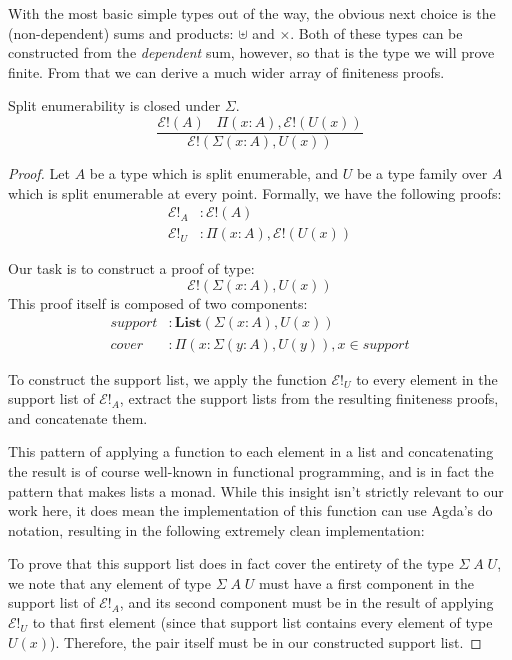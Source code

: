 With the most basic simple types out of the way, the obvious next choice is the
(non-dependent) sums and products: \(\uplus\) and \(\times\).
Both of these types can be constructed from the \emph{dependent} sum, however,
so that is the type we will prove finite.
From that we can derive a much wider array of finiteness proofs.
\begin{lemma} \label{split-enum-sigma}
  Split enumerability is closed under \(\Sigma\).
  \begin{equation}
    \frac{
      \mathcal{E}!(A) \; \; \; \Pi(x : A) , \mathcal{E}!(U(x))
    }{
      \mathcal{E}!(\Sigma(x : A) , U(x))
    }
  \end{equation}
\end{lemma}
\begin{proof}
  Let \(A\) be a type which is split enumerable, and \(U\) be a type family over
  \(A\) which is split enumerable at every point.
  Formally, we have the following proofs:
  \begin{align}
    \mathcal{E}!_A &: \mathcal{E}!(A) \\
    \mathcal{E}!_U &: \Pi(x : A) , \mathcal{E}!(U(x))
  \end{align}

  Our task is to construct a proof of type:
  \begin{equation}
    \mathcal{E}!(\Sigma(x : A) , U(x))
  \end{equation}
  This proof itself is composed of two components:
  \begin{align}
    \mathit{support} &: \mathbf{List}(\Sigma(x : A) , U(x)) \\
    \mathit{cover} &: \Pi(x : \Sigma(y : A) , U(y)) , x \in \mathit{support}
  \end{align}

  To construct the support list, we apply the function \(\mathcal{E}!_U\) to
  every element in the support list of \(\mathcal{E}!_A\), extract the support
  lists from the resulting finiteness proofs, and concatenate them.

  \begin{agdalisting}
    This pattern of applying a function to each element in a list and
    concatenating the result is of course well-known in functional programming,
    and is in fact the pattern that makes lists a monad.
    While this insight isn't strictly relevant to our work here, it does mean
    the implementation of this function can use Agda's do notation, resulting
    in the following extremely clean implementation:
  \end{agdalisting}

  To prove that this support list does in fact cover the entirety of the type
  \(\Sigma \; A \; U\), we note that any element of type \(\Sigma \; A \; U\)
  must have a first component in the support list of \(\mathcal{E}!_A\), and its
  second component must be in the result of applying \(\mathcal{E}!_U\) to that
  first element (since that support list contains every element of type
  \(U(x)\)).
  Therefore, the pair itself must be in our constructed support list.
\end{proof}
